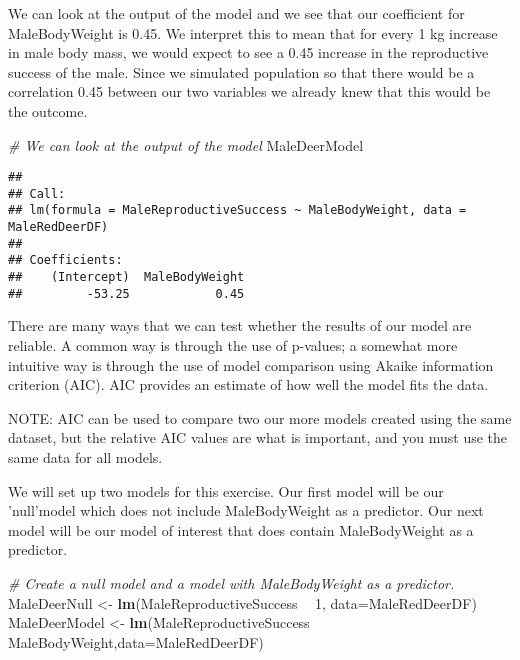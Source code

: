 \documentclass[]{book}
\newenvironment{Shaded}{\begin{snugshade}}{\end{snugshade}}
\newcommand{\CommentTok}[1]{\textcolor[rgb]{0.56,0.35,0.01}{\textit{#1}}}
\newcommand{\DataTypeTok}[1]{\textcolor[rgb]{0.13,0.29,0.53}{#1}}
\newcommand{\DecValTok}[1]{\textcolor[rgb]{0.00,0.00,0.81}{#1}}
\newcommand{\KeywordTok}[1]{\textcolor[rgb]{0.13,0.29,0.53}{\textbf{#1}}}
\newcommand{\NormalTok}[1]{#1}
\newcommand{\OperatorTok}[1]{\textcolor[rgb]{0.81,0.36,0.00}{\textbf{#1}}}
\newcommand{\StringTok}[1]{\textcolor[rgb]{0.31,0.60,0.02}{#1}}
\begin{document}
We can look at the output of the model and we see that our coefficient for MaleBodyWeight is 0.45. We interpret this to mean that for every 1 kg increase in male body mass, we would expect to see a 0.45 increase in the reproductive success of the male. Since we simulated population so that there would be a correlation 0.45 between our two variables we already knew that this would be the outcome.

\begin{Shaded}
\begin{Highlighting}[]
\CommentTok{# We can look at the output of the model  }
\NormalTok{MaleDeerModel}
\end{Highlighting}
\end{Shaded}

\begin{verbatim}
## 
## Call:
## lm(formula = MaleReproductiveSuccess ~ MaleBodyWeight, data = MaleRedDeerDF)
## 
## Coefficients:
##    (Intercept)  MaleBodyWeight  
##         -53.25            0.45
\end{verbatim}

There are many ways that we can test whether the results of our model are reliable. A common way is through the use of p-values; a somewhat more intuitive way is through the use of model comparison using Akaike information criterion (AIC). AIC provides an estimate of how well the model fits the data.

NOTE: AIC can be used to compare two our more models created using the same dataset, but the relative AIC values are what is important, and you must use the same data for all models.

We will set up two models for this exercise. Our first model will be our 'null'model which does not include MaleBodyWeight as a predictor. Our next model will be our model of interest that does contain MaleBodyWeight as a predictor.

\begin{Shaded}
\begin{Highlighting}[]
\CommentTok{# Create a null model and a model with MaleBodyWeight as a predictor.}
\NormalTok{MaleDeerNull <-}\StringTok{ }\KeywordTok{lm}\NormalTok{(MaleReproductiveSuccess }\OperatorTok{~}\StringTok{ }\DecValTok{1}\NormalTok{, }\DataTypeTok{data=}\NormalTok{MaleRedDeerDF)}
\NormalTok{MaleDeerModel <-}\StringTok{ }\KeywordTok{lm}\NormalTok{(MaleReproductiveSuccess }\OperatorTok{~}\StringTok{ }\NormalTok{MaleBodyWeight,}\DataTypeTok{data=}\NormalTok{MaleRedDeerDF)}
\end{Highlighting}
\end{Shaded}
\end{document}
